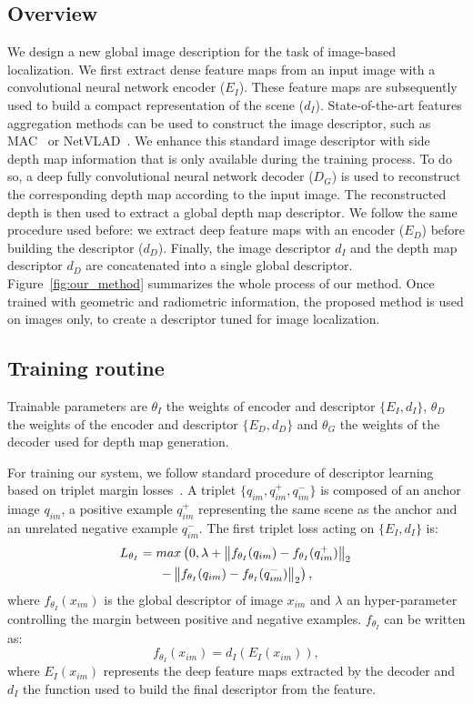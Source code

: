 \subsection{Overview}
\label{subsec:overview}
We design a new global image description for the task of image-based localization. We first extract dense feature maps from an input image with a convolutional neural network encoder ($E_I$). These feature maps are subsequently used to build a compact representation of the scene ($d_I$). State-of-the-art features aggregation methods can be used to construct the image descriptor, such as MAC~\cite{Radenovic2017} or NetVLAD~\cite{Arandjelovic2017}. We enhance this standard image descriptor with side depth map information that is only available during the training process. To do so, a deep fully convolutional neural network decoder ($D_G$) is used to reconstruct the corresponding depth map according to the input image. The reconstructed depth is then used to extract a global depth map descriptor. We follow the same procedure used before: we extract deep feature maps with an encoder ($E_D$) before building the descriptor ($d_D$). Finally, the image descriptor $d_I$ and the depth map descriptor $d_D$ are concatenated into a single global descriptor. Figure~\ref{fig:our_method} summarizes the whole process of our method. Once trained with geometric and radiometric information, the proposed method is used on images only, to create a descriptor tuned for image localization.

\subsection{Training routine}
\label{subsec:training}
Trainable parameters are $\theta_{I}$ the weights of encoder and descriptor $\{E_I, d_I\}$, $\theta_{D}$ the weights of the encoder and descriptor $\{E_D, d_D\}$ and $\theta_{G}$ the weights of the decoder used for depth map generation. 

For training our system, we follow standard procedure of descriptor learning based on triplet margin losses~\cite{Arandjelovic2017}. A triplet $\{q_{im}, q_{im}^+, q_{im}^-\}$ is composed of an anchor image $q_{im}$, a positive example $q_{im}^+$ representing the same scene as the anchor and an unrelated negative example $q_{im}^-$.
The first triplet loss acting on $\{E_I, d_I\}$ is:
\begin{multline}
	\label{eq:triplet_loss}
	L_{\theta_{I}} = max\left(0, \lambda + \left\lVert f_{\theta_{I}}(q_{im}) - f_{\theta_{I}}(q_{im}^+)\right\rVert_2  \right. \\	
	\left. - \left\lVert f_{\theta_{I}}(q_{im}) - f_{\theta_{I}}(q_{im}^-)\right\rVert_2 \right),
\end{multline}
where $f_{\theta_{I}}(x_{im})$ is the global descriptor of image $x_{im}$ and $\lambda$ an hyper-parameter controlling the margin between positive and negative examples. $f_{\theta_{I}}$ can be written as:
\begin{equation}
	\label{eq:desc_details}
	f_{\theta_{I}}(x_{im}) = d_I(E_I(x_{im})),
\end{equation}
where $E_I(x_{im})$ represents the deep feature maps extracted by the decoder and $d_I$ the function used to build the final descriptor from the feature.

